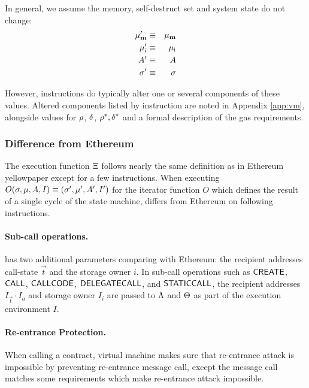 In general, we assume the memory, self-destruct set and system state do not change:
\begin{eqnarray}
\mathbf{\mu}'_{\mathbf{m}} & \equiv & \mathbf{\mu}_{\mathbf{m}} \\
\mathbf{\mu}'_{\mathrm{i}} & \equiv & \mathbf{\mu}_{\mathrm{i}} \\
A' & \equiv & A \\
\mathbf{\sigma}' & \equiv & \mathbf{\sigma}
\end{eqnarray}

However, instructions do typically alter one or several components of these values. Altered components listed by instruction are noted in Appendix \ref{app:vm}, alongside values for $\mathbf{\rho}$, $\mathbf{\delta}$, $\mathbf{\rho}^*,\mathbf{\delta}^*$ and a formal description of the gas requirements.

\subsubsection{Difference from Ethereum}
The execution function $\mathrm{\Xi}$ follows nearly the same definition as in Ethereum yellowpaper \cite{ETH_yellow} except for a few instructions. 
When executing $O(\mathbf{\sigma}, \mu, A, I) \equiv (\mathbf{\sigma}' , \mu' , A' , I')$ 
for the iterator function $O$ which defines the result of a single cycle of the state machine,
{\name} differs from Ethereum on following instructions. 


\paragraph{Sub-call operations.} 
{\name} has two additional parameters comparing with Ethereum: 
the recipient addresses call-state $\vec{t}$ and the storage owner $i$.
In sub-call operations such as $\mathsf{CREATE}$, $\mathsf{CALL}$, $\mathsf{CALLCODE}$, $\mathsf{DELEGATECALL}$, and $\mathsf{STATICCALL}$,  
the recipient addresses $I_\vec{t}\cdot I_a$ and storage owner $I_i$ are passed to $\mathrm{\Lambda}$ and $\mathrm{\Theta}$ as part of the execution environment $I$. 

\paragraph{Re-entrance Protection.}

When calling a contract, {\name} virtual machine makes sure that re-entrance attack is impossible by preventing re-entrance message call, except the message call matches some requirements which make re-entrance attack impossible. 

